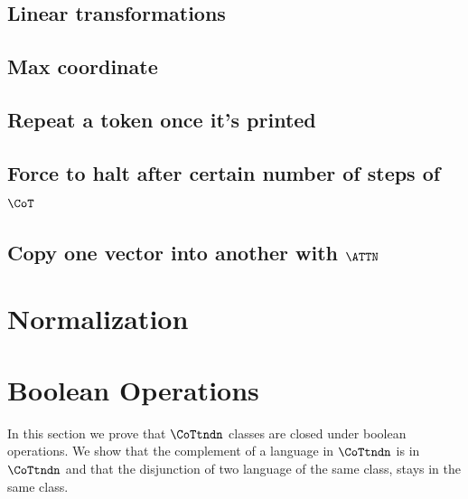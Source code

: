 

\subsection{Linear transformations}\label{lin-tranf}



\subsection{Max coordinate}\label{maximum}



\subsection{Repeat a token once it's printed}\label{repeat-token}



\subsection{Force to halt after certain number of steps of $\CoT$}



\subsection{Copy one vector into another with $\ATTN$}\label{copy-vector}



\section{Normalization}\label{det-norm}




\section{Boolean Operations}\label{det-bool}

In this section we prove that $\CoTtndn$ classes are closed under boolean operations.
We show that the complement of a language in $\CoTtndn$ is in $\CoTtndn$ and that the disjunction of two language of the same class, stays in the same class.

